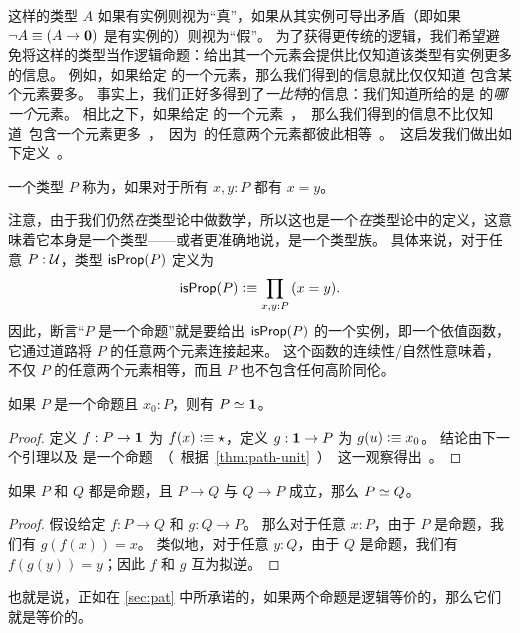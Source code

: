 这样的类型 $A$ 如果有实例则视为``真''，如果从其实例可导出矛盾（即如果 $\neg A \equiv (A\to\mathbf{0})$ 是有实例的）则视为``假''。
%
为了获得更传统的逻辑，我们希望避免将这样的类型当作逻辑命题：给出其一个元素会提供比仅知道该类型有实例更多的信息。
例如，如果给定 \bool 的一个元素，那么我们得到的信息就比仅仅知道 \bool 包含某个元素要多。
事实上，我们正好多得到了\emph{一比特}的信息：我们知道所给的是 \bool 的\emph{哪一个}元素。
相比之下，如果给定 \unit 的一个元素，那么我们得到的信息不比仅知道 \unit 包含一个元素更多，因为 \unit 的任意两个元素都彼此相等。
这启发我们做出如下定义。

\begin{defn}\label{defn:isprop}
  一个类型 $P$ 称为，如果对于所有 $x,y:P$ 都有 $x=y$。
\end{defn}

注意，由于我们仍然\emph{在}类型论中做数学，所以这也是一个\emph{在}类型论中的定义，这意味着它本身是一个类型——或者更准确地说，是一个类型族。
具体来说，对于任意 $P:\mathcal{U}$，类型 $\mathsf{isProp}(P)$ 定义为
\[ \isprop(P) \defeq \prd{x,y:P} (x=y). \]
因此，断言``$P$ 是一个命题''就是要给出 $\mathsf{isProp}(P)$ 的一个实例，即一个依值函数，它通过道路将 $P$ 的任意两个元素连接起来。
这个函数的连续性/自然性意味着，不仅 $P$ 的任意两个元素相等，而且 $P$ 也不包含任何高阶同伦。

\begin{lem}\label{thm:inhabprop-eqvunit}
  如果 $P$ 是一个命题且 $x_0:P$，则有 $P \simeq \mathbf{1}$。
\end{lem}

\begin{proof}
  定义 $f:P\to\mathbf{1}$ 为 $f(x)\vcentcolon\equiv \star$，定义 $g:\mathbf{1}\to P$ 为 $g(u)\vcentcolon\equiv x_0$。
  结论由下一个引理以及 \unit 是一个命题（根据 \cref{thm:path-unit}）这一观察得出。
\end{proof}

\begin{lem}\label{lem:equiv-iff-hprop}
  如果 $P$ 和 $Q$ 都是命题，且 $P\to Q$ 与 $Q\to P$ 成立，那么 $P \simeq Q$。
\end{lem}

\begin{proof}
  假设给定 $f:P\to Q$ 和 $g:Q\to P$。
  那么对于任意 $x:P$，由于 $P$ 是命题，我们有 $g(f(x))=x$。
  类似地，对于任意 $y:Q$，由于 $Q$ 是命题，我们有 $f(g(y))=y$；因此 $f$ 和 $g$ 互为拟逆。
\end{proof}

也就是说，正如在 \cref{sec:pat} 中所承诺的，如果两个命题是逻辑等价的，那么它们就是等价的。

